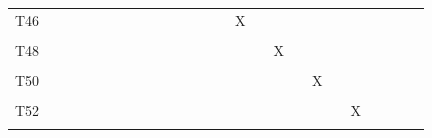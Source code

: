 \documentclass[
]{article}
\begin{document}
\begin{longtable}[l]{lllllllllllllllllllllllll}
\addlinespace
T46 &  &  &  &  &  &  &  &  &  &  &  &  &  & X &  &  &  &  &  &  &  &  &  & \\
\cellcolor{gray!6}{T47} & \cellcolor{gray!6}{} & \cellcolor{gray!6}{} & \cellcolor{gray!6}{} & \cellcolor{gray!6}{} & \cellcolor{gray!6}{} & \cellcolor{gray!6}{} & \cellcolor{gray!6}{} & \cellcolor{gray!6}{} & \cellcolor{gray!6}{} & \cellcolor{gray!6}{} & \cellcolor{gray!6}{} & \cellcolor{gray!6}{} & \cellcolor{gray!6}{} & \cellcolor{gray!6}{} & \cellcolor{gray!6}{X} & \cellcolor{gray!6}{} & \cellcolor{gray!6}{} & \cellcolor{gray!6}{} & \cellcolor{gray!6}{} & \cellcolor{gray!6}{} & \cellcolor{gray!6}{} & \cellcolor{gray!6}{} & \cellcolor{gray!6}{} & \cellcolor{gray!6}{}\\
T48 &  &  &  &  &  &  &  &  &  &  &  &  &  &  &  & X &  &  &  &  &  &  &  & \\
\cellcolor{gray!6}{T49} & \cellcolor{gray!6}{} & \cellcolor{gray!6}{} & \cellcolor{gray!6}{} & \cellcolor{gray!6}{} & \cellcolor{gray!6}{} & \cellcolor{gray!6}{} & \cellcolor{gray!6}{} & \cellcolor{gray!6}{} & \cellcolor{gray!6}{} & \cellcolor{gray!6}{} & \cellcolor{gray!6}{} & \cellcolor{gray!6}{} & \cellcolor{gray!6}{} & \cellcolor{gray!6}{} & \cellcolor{gray!6}{} & \cellcolor{gray!6}{} & \cellcolor{gray!6}{X} & \cellcolor{gray!6}{} & \cellcolor{gray!6}{} & \cellcolor{gray!6}{} & \cellcolor{gray!6}{} & \cellcolor{gray!6}{} & \cellcolor{gray!6}{} & \cellcolor{gray!6}{}\\
T50 &  &  &  &  &  &  &  &  &  &  &  &  &  &  &  &  &  & X &  &  &  &  &  & \\
\addlinespace
\cellcolor{gray!6}{T51} & \cellcolor{gray!6}{} & \cellcolor{gray!6}{} & \cellcolor{gray!6}{} & \cellcolor{gray!6}{} & \cellcolor{gray!6}{} & \cellcolor{gray!6}{} & \cellcolor{gray!6}{} & \cellcolor{gray!6}{} & \cellcolor{gray!6}{} & \cellcolor{gray!6}{} & \cellcolor{gray!6}{} & \cellcolor{gray!6}{} & \cellcolor{gray!6}{} & \cellcolor{gray!6}{} & \cellcolor{gray!6}{} & \cellcolor{gray!6}{} & \cellcolor{gray!6}{} & \cellcolor{gray!6}{} & \cellcolor{gray!6}{X} & \cellcolor{gray!6}{} & \cellcolor{gray!6}{} & \cellcolor{gray!6}{} & \cellcolor{gray!6}{} & \cellcolor{gray!6}{}\\
T52 &  &  &  &  &  &  &  &  &  &  &  &  &  &  &  &  &  &  &  & X &  &  &  & \\
\cellcolor{gray!6}{T53} & \cellcolor{gray!6}{} & \cellcolor{gray!6}{} & \cellcolor{gray!6}{} & \cellcolor{gray!6}{} & \cellcolor{gray!6}{} & \cellcolor{gray!6}{} & \cellcolor{gray!6}{} & \cellcolor{gray!6}{} & \cellcolor{gray!6}{} & \cellcolor{gray!6}{} & \cellcolor{gray!6}{} & \cellcolor{gray!6}{} & \cellcolor{gray!6}{} & \cellcolor{gray!6}{} & \cellcolor{gray!6}{} & \cellcolor{gray!6}{} & \cellcolor{gray!6}{} & \cellcolor{gray!6}{} & \cellcolor{gray!6}{} & \cellcolor{gray!6}{} & \cellcolor{gray!6}{X} & \cellcolor{gray!6}{} & \cellcolor{gray!6}{} & \cellcolor{gray!6}{}\\

\end{longtable}
\end{document}
